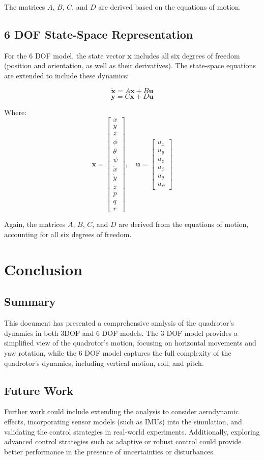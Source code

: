 \documentclass[a4paper,12pt]{report}
\begin{document}
The matrices \(A\), \(B\), \(C\), and \(D\) are derived based on the equations of motion.

\section{6 DOF State-Space Representation}
For the 6 DOF model, the state vector \(\mathbf{x}\) includes all six degrees of freedom (position and orientation, as well as their derivatives). The state-space equations are extended to include these dynamics:

\[
    \dot{\mathbf{x}} = A\mathbf{x} + B\mathbf{u}
\]
\[
    \mathbf{y} = C\mathbf{x} + D\mathbf{u}
\]

Where:
\[
    \mathbf{x} = \begin{bmatrix} x \\ y \\ z \\ \phi \\ \theta \\ \psi \\ \dot{x} \\ \dot{y} \\ \dot{z} \\ p \\ q \\ r \end{bmatrix}, \quad \mathbf{u} = \begin{bmatrix} u_x \\ u_y \\ u_z \\ u_\phi \\ u_\theta \\ u_\psi \end{bmatrix}
\]

Again, the matrices \(A\), \(B\), \(C\), and \(D\) are derived from the equations of motion, accounting for all six degrees of freedom.

\chapter{Conclusion}

\section{Summary}
This document has presented a comprehensive analysis of the quadrotor's dynamics in both 3DOF and 6 DOF models. The 3 DOF model provides a simplified view of the quadrotor's motion, focusing on horizontal movements and yaw rotation, while the 6 DOF model captures the full complexity of the quadrotor's dynamics, including vertical motion, roll, and pitch.

\section{Future Work}
Further work could include extending the analysis to consider aerodynamic effects, incorporating sensor models (such as IMUs) into the simulation, and validating the control strategies in real-world experiments. Additionally, exploring advanced control strategies such as adaptive or robust control could provide better performance in the presence of uncertainties or disturbances.
\end{document}
